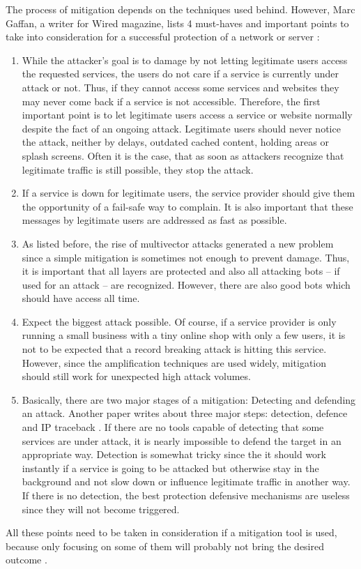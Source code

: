 The process of mitigation depends on the techniques used behind. However, Marc Gaffan, a writer for Wired magazine, lists 4 must-haves and important points to take into consideration for a successful protection of a network or server \cite{Wired-DDoSMitigation}: 
\begin{enumerate}
    \item While the attacker's goal is to damage by not letting legitimate users access the requested services, the users do not care if a service is currently under attack or not. Thus, if they cannot access some services and websites they may never come back if a service is not accessible. Therefore, the first important point is to let legitimate users access a service or website normally despite the fact of an ongoing attack. Legitimate users should never notice the attack, neither by delays, outdated cached content, holding areas or splash screens. Often it is the case, that as soon as attackers recognize that legitimate traffic is still possible, they stop the attack.
    \item If a service is down for legitimate users, the service provider should give them the opportunity of a fail-safe way to complain. 
    It is also important that these messages by legitimate users are addressed as fast as possible.
    \item As listed before, the rise of multivector attacks generated a new problem since a simple mitigation is sometimes not enough to prevent damage. Thus, it is important that all layers are protected and also all attacking bots -- if used for an attack -- are recognized. However, there are also good bots which should have access all time.
    \item Expect the biggest attack possible. Of course, if a service provider is only running a small business with a tiny online shop with only a few users, it is not to be expected that a record breaking attack is hitting this service. However, since the amplification techniques are used widely, mitigation should still work for unexpected high attack volumes. 
    \item Basically, there are two major stages of a mitigation: Detecting and defending an attack. Another paper writes about three major steps: detection, defence and IP traceback \cite{DetectionTechniques}. If there are no tools capable of detecting that some services are under attack, it is nearly impossible to defend the target in an appropriate way. Detection is somewhat tricky since the it should work instantly if a service is going to be attacked but otherwise stay in the background and not slow down or influence legitimate traffic in another way. If there is no detection, the best protection defensive mechanisms are useless since they will not become triggered. 
\end{enumerate}
All these points need to be taken in consideration if a mitigation tool is used, because only focusing on some of them will probably not bring the desired outcome \cite{Wired-DDoSMitigation}.

